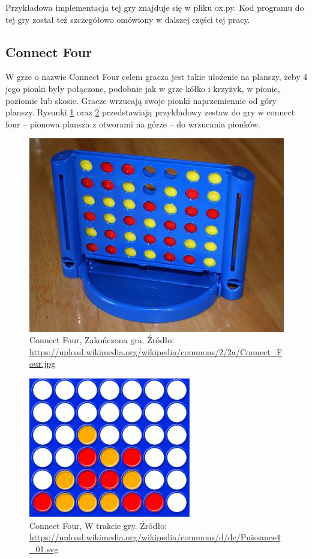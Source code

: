 \documentclass[polish,shortabstract,inz]{iithesis}
\begin{document}
Przykładowa implementacja tej gry znajduje się w pliku ox.py.
Kod programu do tej gry został też szczegółowo omówiony w dalszej części tej pracy.

\subsection{Connect Four}
W grze o nazwie Connect Four celem gracza jest takie ułożenie na planszy, żeby 4 jego pionki były połączone, podobnie jak w grze kółko i krzyżyk, w pionie, poziomie lub skosie.
Gracze wrzucają swoje pionki naprzemiennie od góry planszy.
Rysunki \ref{fig:c4} oraz \ref{fig:c4_2} przedstawiają przykładowy zestaw do gry w connect four -- pionowa plansza z otworami na górze -- do wrzucania pionków.

\begin{figure}[H]
  \includegraphics[scale=0.25]{./images/connect4.jpg}
  \centering
  \caption{Connect Four, Zakończona gra. \newline Źródło:\,\url{https://upload.wikimedia.org/wikipedia/commons/2/2a/Connect\_Four.jpg}}
  \label{fig:c4}
\end{figure}
\begin{figure}[H]
  \includegraphics[scale=0.5]{./images/connect4.png}
  \centering
  \caption{Connect Four, W trakcie gry. \newline Źródło:\,\url{https://upload.wikimedia.org/wikipedia/commons/d/dc/Puissance4\_01.svg}}
  \label{fig:c4_2}
\end{figure}
\end{document}
